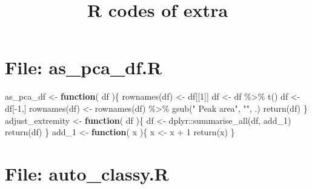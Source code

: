 \documentclass[
]{article}
\title{R codes of extra}
\author{}
\date{\vspace{-2.5em}}
\newenvironment{Shaded}{\begin{snugshade}}{\end{snugshade}}
\newcommand{\ControlFlowTok}[1]{\textcolor[rgb]{0.13,0.29,0.53}{\textbf{#1}}}
\newcommand{\DecValTok}[1]{\textcolor[rgb]{0.00,0.00,0.81}{#1}}
\newcommand{\FunctionTok}[1]{\textcolor[rgb]{0.00,0.00,0.00}{#1}}
\newcommand{\NormalTok}[1]{#1}
\newcommand{\OtherTok}[1]{\textcolor[rgb]{0.56,0.35,0.01}{#1}}
\newcommand{\SpecialCharTok}[1]{\textcolor[rgb]{0.00,0.00,0.00}{#1}}
\newcommand{\StringTok}[1]{\textcolor[rgb]{0.31,0.60,0.02}{#1}}
\begin{document}
\maketitle

{
\setcounter{tocdepth}{3}
\tableofcontents
}
\hypertarget{file-as_pca_df.r}{%
\section{File: as\_pca\_df.R}\label{file-as_pca_df.r}}

\begin{Shaded}
\begin{Highlighting}[]
\NormalTok{as\_pca\_df }\OtherTok{\textless{}{-}} 
  \ControlFlowTok{function}\NormalTok{(}
\NormalTok{           df}
\NormalTok{           )\{}
    \FunctionTok{rownames}\NormalTok{(df) }\OtherTok{\textless{}{-}}\NormalTok{ df[[}\DecValTok{1}\NormalTok{]]}
\NormalTok{    df }\OtherTok{\textless{}{-}}\NormalTok{ df }\SpecialCharTok{\%\textgreater{}\%}
      \FunctionTok{t}\NormalTok{()}
\NormalTok{    df }\OtherTok{\textless{}{-}}\NormalTok{ df[}\SpecialCharTok{{-}}\DecValTok{1}\NormalTok{,]}
    \FunctionTok{rownames}\NormalTok{(df) }\OtherTok{\textless{}{-}} \FunctionTok{rownames}\NormalTok{(df) }\SpecialCharTok{\%\textgreater{}\%}
      \FunctionTok{gsub}\NormalTok{(}\StringTok{" Peak area"}\NormalTok{, }\StringTok{""}\NormalTok{, .)}
    \FunctionTok{return}\NormalTok{(df)}
\NormalTok{  \}}
\NormalTok{adjust\_extremity }\OtherTok{\textless{}{-}} 
  \ControlFlowTok{function}\NormalTok{(}
\NormalTok{           df}
\NormalTok{           )\{}
\NormalTok{    df }\OtherTok{\textless{}{-}}\NormalTok{ dplyr}\SpecialCharTok{::}\FunctionTok{summarise\_all}\NormalTok{(df, add\_1)}
    \FunctionTok{return}\NormalTok{(df)}
\NormalTok{  \}}
\NormalTok{add\_1 }\OtherTok{\textless{}{-}}
  \ControlFlowTok{function}\NormalTok{(}
\NormalTok{           x}
\NormalTok{           )\{}
\NormalTok{    x }\OtherTok{\textless{}{-}}\NormalTok{ x }\SpecialCharTok{+} \DecValTok{1}
    \FunctionTok{return}\NormalTok{(x)}
\NormalTok{  \}}
\end{Highlighting}
\end{Shaded}

\hypertarget{file-auto_classy.r}{%
\section{File: auto\_classy.R}\label{file-auto_classy.r}}
\end{document}
